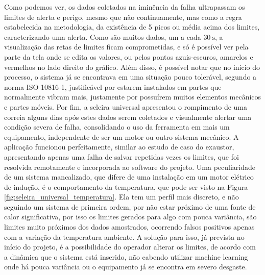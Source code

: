 Como podemos ver, os dados coletados na iminência da falha ultrapassam os limites de alerta e perigo, mesmo que não continuamente, mas
como a regra estabelecida na metodologia, da existência de 5 picos ou média acima dos limites, caracterizando uma alerta. Como são muitos dados,
um a cada $\SI{30}{\second}$, a visualização das retas de limites ficam comprometidas, e só é possível ver pela parte da tela onde se edita os
valores, ou pelos pontos azuis-escuros, amarelos e vermelhos no lado direito do gráfico. Além disso, é possível notar que no início do processo,
o sistema já se encontrava em uma situação pouco tolerável, segundo a norma ISO 10816-1, justificável por estarem instalados em partes que 
normalmente vibram mais, justamente por possuírem muitos elementos mecânicos e partes móveis. Por fim, a seleira universal apresentou o rompimento de uma
correia alguns dias após estes dados serem coletados e visualmente alertar uma condição severa de falha, consolidando o uso da ferramenta em
mais um equipamento, independente de ser um motor ou outro sistema mecânico. A aplicação funcionou perfeitamente, similar ao estudo de caso do
exaustor, apresentando apenas uma falha de salvar repetidas vezes os limites, que foi resolvida remotamente e incorporada ao software do projeto.
Uma peculiaridade de um sistema mancalizado, que difere de uma instalação em um motor elétrico de indução, é o comportamento da temperatura,
que pode ser visto na Figura \ref{fig:seleira_universal_temperatura}. 
Ela tem um perfil mais discreto, e não seguindo um sistema de primeira ordem, por não estar próximo de uma fonte de calor significativa, por isso
os limites gerados para algo com pouca variância, são limites muito próximos dos dados amostrados, ocorrendo falsos positivos apenas com a
variação da temperatura ambiente. A solução para isso, já prevista no início do projeto, é a possibilidade do operador alterar os limites, de 
acordo com a dinâmica que o sistema está inserido, não cabendo utilizar  machine learning onde há pouca variância ou o equipamento já se 
encontra em severo desgaste. 

